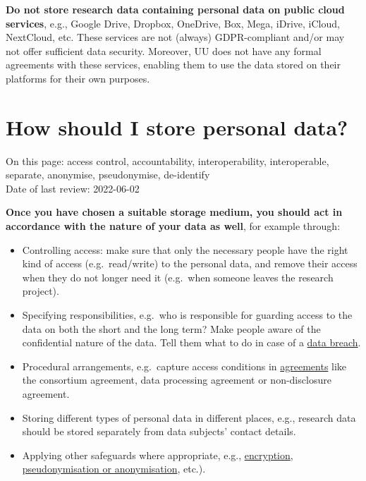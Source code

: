 \documentclass[
]{book}
\providecommand{\tightlist}{%
  \setlength{\itemsep}{0pt}\setlength{\parskip}{0pt}}
\begin{document}
\textbf{Do not store research data containing personal data on public cloud services},
e.g., Google Drive, Dropbox, OneDrive, Box, Mega, iDrive, iCloud, NextCloud, etc.
These services are not (always) GDPR-compliant and/or may not offer sufficient
data security. Moreover, UU does not have any formal agreements with these
services, enabling them to use the data stored on their platforms for their own
purposes.

\hypertarget{data-storage-how}{%
\section{How should I store personal data?}\label{data-storage-how}}

On this page: access control, accountability, interoperability, interoperable,
separate, anonymise, pseudonymise, de-identify\\
Date of last review: 2022-06-02

\textbf{Once you have chosen a suitable storage medium, you should act in accordance
with the nature of your data as well}, for example through:

\begin{itemize}
\tightlist
\item
  Controlling access: make sure that only the necessary people have the right
  kind of access (e.g.~read/write) to the personal data, and remove their access
  when they do not longer need it (e.g.~when someone leaves the research project).\\
\item
  Specifying responsibilities, e.g.~who is responsible for guarding access to the
  data on both the short and the long term? Make people aware of the confidential
  nature of the data. Tell them what to do in case of a
  \href{https://intranet.uu.nl/en/knowledgebase/what-is-a-personal-data-breach}{data breach}.
\item
  Procedural arrangements, e.g.~capture access conditions in
  \protect\hyperlink{agreements}{agreements} like the consortium agreement, data processing
  agreement or non-disclosure agreement.
\item
  Storing different types of personal data in different places, e.g., research
  data should be stored separately from data subjects' contact details.
\item
  Applying other safeguards where appropriate, e.g., \protect\hyperlink{encryption}{encryption},
  \protect\hyperlink{pseudonymisation-anonymisation}{pseudonymisation or anonymisation}, etc.).
\end{itemize}
\end{document}
